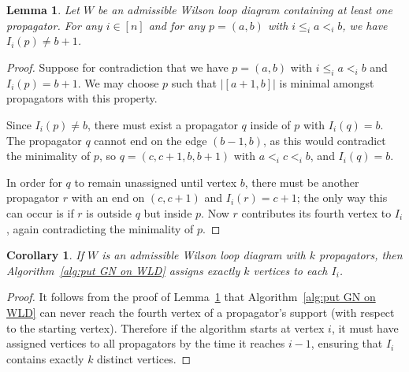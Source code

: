 \documentclass[11pt]{article}
\newtheorem{lem}[thm]{Lemma}
\newtheorem{cor}[thm]{Corollary}
\theoremstyle{remark}
\theoremstyle{definition}
\begin{document}
\begin{lem}\label{lem no fourth vertex}
Let $W$ be an admissible Wilson loop diagram containing at least one propagator. For any $i \in [n]$ and for any $p=(a,b)$ with $i\leq_i a <_i b$, we have $I_i(p) \neq b+1$.
\end{lem}
\begin{proof}
Suppose for contradiction that we have $p = (a,b)$ with $i\leq_i a <_i b$ and $I_{i}(p) = b+1$. We may choose $p$ such that $|[a+1,b]|$ is minimal amongst propagators with this property.

Since $I_i(p) \neq b$, there must exist a propagator $q$ inside of $p$ with $I_i(q) = b$. The propagator $q$ cannot end on the edge $(b-1,b)$, as this would contradict the minimality of $p$, so $q = (c,c+1,b,b+1)$ with $a <_i c <_i b$, and $I_i(q) = b$. 

In order for $q$ to remain unassigned until vertex $b$, there must be another propagator $r$ with an end on $(c,c+1)$ and $I_i(r) = c+1$; the only way this can occur is if $r$ is outside $q$ but inside $p$. Now $r$ contributes its fourth vertex to $I_i$, again contradicting the minimality of $p$.
\end{proof}

\begin{cor}\label{GN alg well defined}
If $W$ is an admissible Wilson loop diagram with $k$ propagators, then Algorithm~\ref{alg:put GN on WLD} assigns exactly $k$ vertices to each $I_i$.
\end{cor}
\begin{proof}
It follows from the proof of Lemma~\ref{lem no fourth vertex} that Algorithm~\ref{alg:put GN on WLD} can never reach the fourth vertex of a propagator's support (with respect to the starting vertex). Therefore if the algorithm starts at vertex $i$, it must have assigned vertices to all propagators by the time it reaches $i-1$, ensuring that $I_i$ contains exactly $k$ distinct vertices.
\end{proof}
\end{document}
